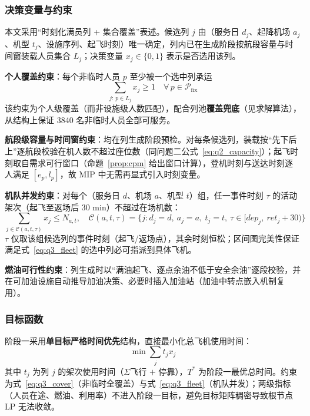 \documentclass[withoutpreface]{cumcmthesis}
\begin{document}
\subsubsection{决策变量与约束}

本文采用``时刻化满员列 + 集合覆盖''表述。候选列 $j$ 由（服务日 $d_j$、起降机场 $a_j$、机型 $t_j$、设施序列、起飞时刻）唯一确定，列内已在生成阶段按航段容量与时间窗装载人员集合 $L_j$；决策变量 $x_j \in \{0,1\}$ 表示是否选用该列。

\textbf{个人覆盖约束}：每个非临时人员 $p$ 至少被一个选中列承运
\begin{equation}
\sum_{j:\, p \in L_j} x_j \geq 1 \quad \forall\, p \in \mathcal{P}_{\mathrm{fix}}
\label{eq:q3_cover}
\end{equation}
该约束为个人级覆盖（而非设施级人数匹配），配合列池\textbf{覆盖兜底}（见求解算法），从结构上保证 3840 名非临时人员全部可服务。

\textbf{航段级容量与时间窗约束}：均在列生成阶段预检。对每条候选列，装载按``先下后上''逐航段校验在机人数不超过座位数（同问题二公式~\eqref{eq:q2_capacity}）；起飞时刻取自需求可行窗口（命题~\ref{prop:cpm} 给出窗口计算），登机时刻与送达时刻逐人满足 $[e_p, l_p]$，故 MIP 中无需再显式引入时刻变量。

\textbf{机队并发约束}：对每个（服务日 $d$、机场 $a$、机型 $t$）组，任一事件时刻 $\tau$ 的活动架次（起飞至返场后 30 min）不超过在场机数：
\begin{equation}
\sum_{j \in \mathcal{C}(a,t,\tau)} x_j \leq N_{a,t}, \quad
\mathcal{C}(a,t,\tau) = \{ j : d_j = d,\ a_j = a,\ t_j = t,\ \tau \in [dep_j,\ ret_j + 30) \}
\label{eq:q3_fleet}
\end{equation}
$\tau$ 仅取该组候选列的事件时刻（起飞/返场点），其余时刻恒松；区间图完美性保证满足式~\eqref{eq:q3_fleet} 的选中列必可指派到具体飞机。

\textbf{燃油可行性约束}：列生成时以``满油起飞、逐点余油不低于安全余油''逐段校验，并在可加油设施自动推导加油决策、必要时插入加油站（加油中转点嵌入机制复用）。

\subsubsection{目标函数}

阶段一采用\textbf{单目标严格时间优先}结构，直接最小化总飞机使用时间：
\begin{equation}
\min \sum_j t_j x_j
\label{eq:q3_obj}
\end{equation}
其中 $t_j$ 为列 $j$ 的架次使用时间（$\Sigma$飞行 $+$ 停靠），$T^*$ 为阶段一最优总时间。约束为式~\eqref{eq:q3_cover}（非临时全覆盖）与式~\eqref{eq:q3_fleet}（机队并发）；两级指标（人员在途、燃油、利用率）不进入阶段一目标，避免目标矩阵稠密导致根节点 LP 无法收敛。
\end{document}
